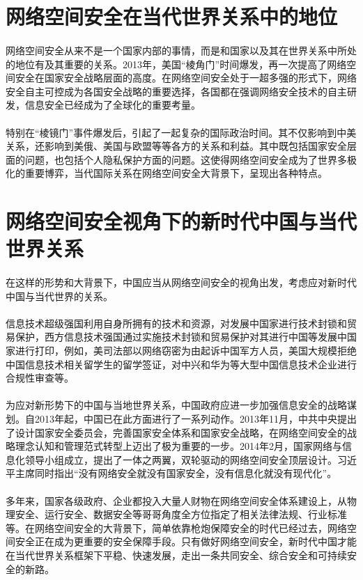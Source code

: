 \documentclass[10pt,letterpaper]{article}
\begin{document}
\section{网络空间安全在当代世界关系中的地位}

\paragraph{} 网络空间安全从来不是一个国家内部的事情，而是和国家以及其在世界关系中所处的地位有及其重要的关系。2013年，美国“棱角门”时间爆发，再一次提高了网络空间安全在国家安全战略层面的高度。在网络空间安全处于一超多强的形式下，网络安全自主可控成为各国安全战略的重要选择，各国都在强调网络安全技术的自主研发，信息安全已经成为了全球化的重要考量。
\paragraph{} 特别在“棱镜门”事件爆发后，引起了一起复杂的国际政治时间。其不仅影响到中美关系，还影响到美俄、美国与欧盟等等各方的关系和利益。其中既包括国家安全层面的问题，也包括个人隐私保护方面的问题。这使得网络空间安全成为了世界多极化的重要博弈，当代国际关系在网络空间安全大背景下，呈现出各种特点。

\section{网络空间安全视角下的新时代中国与当代世界关系}

\paragraph{} 在这样的形势和大背景下，中国应当从网络空间安全的视角出发，考虑应对新时代中国与当代世界的关系。
\paragraph{} 信息技术超级强国利用自身所拥有的技术和资源，对发展中国家进行技术封锁和贸易保护，西方信息技术强国通过实施技术封锁和贸易保护对其进行中国等发展中国家进行打印，例如，美司法部以网络窃密为由起诉中国军方人员，美国大规模拒绝中国信息技术相关留学生的留学签证，对中兴和华为等大型中国信息技术企业进行合规性审查等。
\paragraph{} 为应对新形势下的中国与当地世界关系，中国政府应进一步加强信息安全的战略谋划。自2013年起，中国已在此方面进行了一系列动作。2013年11月，中共中央提出了设计国家安全委员会，完善国家安全体系和国家安全战略，在网络空间安全的战略理念认知和管理范式转型上迈出了极为重要的一步。2014年2月，国家网络与信息化领导小组成立，提出了一体之两翼，双轮驱动的网络空间安全顶层设计。习近平主席同时指出“没有网络安全就没有国家安全，没有信息化就没有现代化”。
\paragraph{} 多年来，国家各级政府、企业都投入大量人财物在网络空间安全体系建设上，从物理安全、运行安全、数据安全等哥哥角度全方位指定了相关法律法规、行业标准等。在网络空间安全的大背景下，简单依靠枪炮保障安全的时代已经过去，网络空间安全正在成为更重要的安全保障手段。只有做好网络空间安全，新时代中国才能在当代世界关系框架下平稳、快速发展，走出一条共同安全、综合安全和可持续安全的新路。



\end{document}
